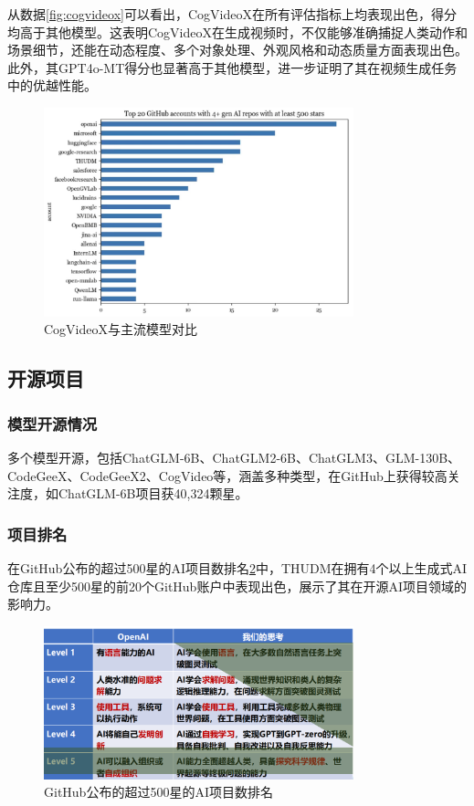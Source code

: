 从数据\ref{fig:cogvideox}可以看出，CogVideoX在所有评估指标上均表现出色，得分均高于其他模型。这表明CogVideoX在生成视频时，不仅能够准确捕捉人类动作和场景细节，还能在动态程度、多个对象处理、外观风格和动态质量方面表现出色。此外，其GPT4o-MT得分也显著高于其他模型，进一步证明了其在视频生成任务中的优越性能。

\begin{figure}[H]
	\centering
	\includegraphics[width=0.8\textwidth]{figures/chapter1/fig14.png}
	\caption{CogVideoX与主流模型对比}
	\label{fig:cogvideox2}
\end{figure}

\subsection{开源项目}

\subsubsection{模型开源情况}

多个模型开源，包括ChatGLM-6B、ChatGLM2-6B、ChatGLM3、GLM-130B、CodeGeeX、CodeGeeX2、CogVideo等，涵盖多种类型，在GitHub上获得较高关注度，如ChatGLM-6B项目获40,324颗星。

\subsubsection{项目排名}

在GitHub公布的超过500星的AI项目数排名\ref{fig:githubrank}中，THUDM在拥有4个以上生成式AI仓库且至少500星的前20个GitHub账户中表现出色，展示了其在开源AI项目领域的影响力。

\begin{figure}[H]
	\centering
	\includegraphics[width=0.8\textwidth]{figures/chapter1/fig15.png}
	\caption{GitHub公布的超过500星的AI项目数排名}
	\label{fig:githubrank}
\end{figure}

